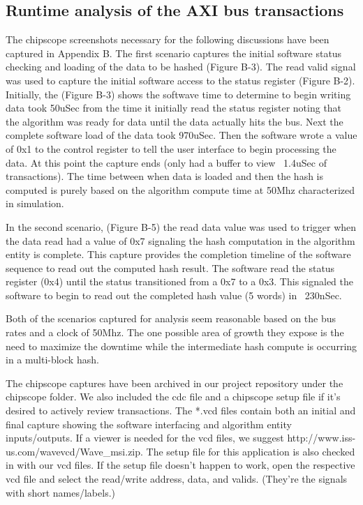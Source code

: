 \documentclass[journal]{IEEEtran}
\begin{document}
\subsection{Runtime analysis of the AXI bus transactions}
The chipscope screenshots necessary for the following discussions have been captured in Appendix B. The first scenario captures the initial software status checking and loading of the data to be hashed  (Figure B-3).  The read valid signal was used to capture the initial software access to the status register (Figure B-2).  Initially, the (Figure B-3) shows the softwave time to determine to begin writing data took 50uSec from the time it initially read the status register noting that the algorithm was ready for data until the data actually hits the bus.  Next the complete software load of the data took 970uSec.  Then the software wrote a value of 0x1 to the control register to tell the user interface to begin processing the data.  At this point the capture ends (only had a buffer to view ~1.4uSec of transactions).  The time between when data is loaded and then the hash is computed is purely based on the algorithm compute time at 50Mhz characterized in simulation.

In the second scenario,   (Figure B-5) the read data value was used to trigger when the data read had a value of 0x7 signaling the hash computation in the algorithm entity is complete.  This capture provides the completion timeline of the software sequence to read out the computed hash result.  The software read the status register (0x4) until the status transitioned from a 0x7 to a 0x3.  This signaled the software to begin to read out the completed hash value (5 words) in ~230nSec.

Both of the scenarios captured for analysis seem reasonable based on the bus rates and a clock of 50Mhz.  The one possible area of growth they expose is the need to maximize the downtime while the intermediate hash compute is occurring in a multi-block hash.

The chipscope captures have been archived in our project repository under the chipscope folder.  We also included the cdc file and a chipscope setup file if it’s desired to actively review transactions.  The *.vcd files contain both an initial and final capture showing the software interfacing and algorithm entity inputs/outputs.  If a viewer is needed for the vcd files, we suggest http://www.iss-us.com/wavevcd/Wave\_msi.zip.  The setup file for this application is also checked in with our vcd files.  If the setup file doesn’t happen to work, open the respective vcd file and select the read/write address, data, and valids.  (They’re the signals with short names/labels.)
\end{document}
